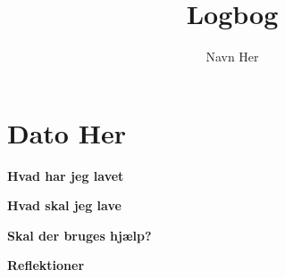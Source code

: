 \documentclass{article}
\title{Logbog}
\author{Navn Her}
\date{}
\begin{document}
	\maketitle
	\tableofcontents
	
	\section{Dato Her}
	
	\textbf{Hvad har jeg lavet}
	
	\textbf{Hvad skal jeg lave}
	
	\textbf{Skal der bruges hjælp?}
	
	\textbf{Reflektioner}
\end{document}
